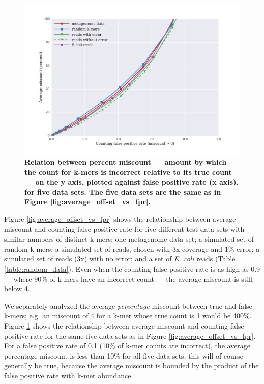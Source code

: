 \begin{figure}[!ht]
\centerline{\includegraphics[width=5in]{./figures/figure6_percent_offset_vs_fpr}}
\caption{\bf Relation between percent miscount --- amount by which the
  count for k-mers is incorrect relative to its true count --- on the
  y axis, plotted against false positive rate (x axis), for five data
  sets.  The five data sets are the same as in Figure
  \ref{fig:average_offset_vs_fpr}.}
\label{fig:percent_offset_vs_fpr}
\end{figure}


Figure \ref{fig:average_offset_vs_fpr} shows the relationship between
average miscount and counting false positive rate for five different test data
sets with similar numbers of distinct k-mers: one metagenome data set;
a simulated set of random k-mers; a simulated set of reads, chosen
with 3x coverage and 1\% error; a simulated set of reads (3x) with no
error; and a set of {\em E. coli} reads (Table
\ref{table:random_data}).  Even when the counting false positive rate is as
high as 0.9 --- where 90\% of k-mers have an incorrect count --- the
average miscount is still below 4.

We separately analyzed the average {\em percentage} miscount between
true and false k-mers; e.g. an miscount of 4 for a k-mer whose true
count is 1 would be 400\%.  Figure \ref{fig:percent_offset_vs_fpr}
shows the relationship between average miscount and counting false
positive rate for the same five data sets as in Figure
\ref{fig:average_offset_vs_fpr}.  For a false positive rate of 0.1 (10\% of
k-mer counts are incorrect), the average percentage miscount is less
than 10\% for all five data sets; this will of course generally be
true, because the average miscount is bounded by the product of the
false positive rate with k-mer abundance.

